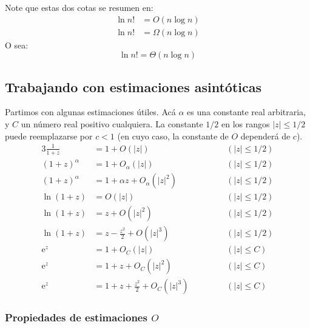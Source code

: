   Note que estas dos cotas se resumen en:
  \begin{align*}
    \ln n!
      &= O(n \log n) \\
    \ln n!
      &= \Omega(n \log n)
  \end{align*}
  O sea:
  \begin{equation*}
    \ln n!
      = \Theta(n \log n)
  \end{equation*}

\subsection{Trabajando con estimaciones asintóticas}
\label{sec:asymptotics-use}

  Partimos con algunas estimaciones útiles.
  Acá \(\alpha\) es una constante real arbitraria,
  y \(C\) un número real positivo cualquiera.
  La constante \(1/2\) en los rangos \(\lvert z \rvert \le 1/2\)
  puede reemplazarse por \(c < 1\)
  (en cuyo caso,
   la constante de \(O\) dependerá de \(c\)).
  \begin{alignat*}{3}
    \frac{1}{1 + z}
       &= 1 + O(\lvert z \rvert)
       &&\qquad& (\lvert z \rvert \le 1/2) \\
    (1 + z)^\alpha
       &= 1 + O_\alpha(\lvert z \rvert)
       &&& (\lvert z \rvert \le 1/2) \\
    (1 + z)^\alpha
       &= 1 + \alpha z + O_\alpha(\lvert z \rvert^2)
       &&& (\lvert z \rvert \le 1/2) \\
    \ln (1 + z)
       &= O(\lvert z \rvert)
       &&& (\lvert z \rvert \le 1/2) \\
    \ln (1 + z)
       &= z + O(\lvert z \rvert^2)
       &&& (\lvert z \rvert \le 1/2) \\
    \ln (1 + z)
       &= z - \frac{z^2}{2} + O(\lvert z \rvert^3)
       &&& (\lvert z \rvert \le 1/2) \\
    \mathrm{e}^z
       &= 1 + O_C (\lvert z \rvert)
       &&& (\lvert z \rvert \le C) \\
    \mathrm{e}^z
       &= 1 + z + O_C (\lvert z \rvert^2)
       &&& (\lvert z \rvert \le C) \\
    \mathrm{e}^z
       &= 1 + z + \frac{z^2}{2} + O_C (\lvert z \rvert^3)
       &&& (\lvert z \rvert \le C)
  \end{alignat*}

\subsubsection{Propiedades de estimaciones \(O\)}
\label{sec:properties-O}

